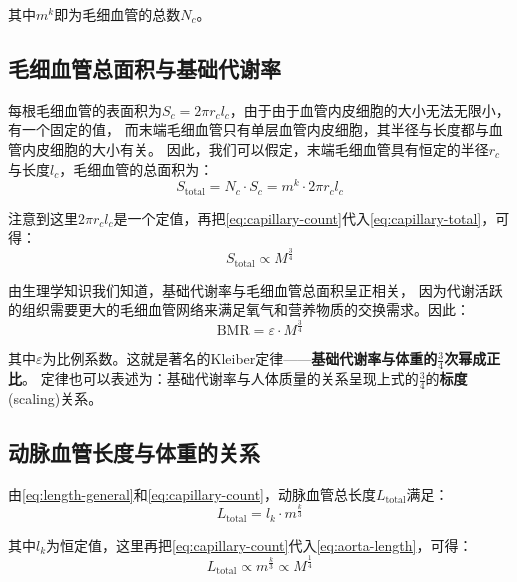 其中$m^k$即为毛细血管的总数$N_c$。

\subsection{毛细血管总面积与基础代谢率}

每根毛细血管的表面积为$S_c = 2\pi r_c l_c$，由于由于血管内皮细胞的大小无法无限小，有一个固定的值，
而末端毛细血管只有单层血管内皮细胞，其半径与长度都与血管内皮细胞的大小有关。
因此，我们可以假定，末端毛细血管具有恒定的半径$r_c$与长度$l_c$，毛细血管的总面积为：
\begin{equation}
S_{\text{total}} = N_c \cdot S_c = m^k \cdot 2\pi r_c l_c
\label{eq:capillary-total}
\end{equation}

注意到这里$ 2\pi r_c l_c$是一个定值，再把\cref{eq:capillary-count}代入\cref{eq:capillary-total}，可得：
\begin{equation}
S_{\text{total}} \propto M^{\frac{3}{4}}
\label{eq:surface-scaling}
\end{equation}

由生理学知识我们知道，基础代谢率与毛细血管总面积呈正相关，
因为代谢活跃的组织需要更大的毛细血管网络来满足氧气和营养物质的交换需求。因此：
\begin{equation}
\text{BMR} = \varepsilon \cdot M^{\frac{3}{4}}
\label{eq:kleiber}
\end{equation}

其中$\varepsilon$为比例系数。这就是著名的Kleiber定律——\textbf{基础代谢率与体重的$\frac{3}{4}$次幂成正比}。
定律也可以表述为：基础代谢率与人体质量的关系呈现上式的$\frac{3}{4}$的\textbf{标度}(scaling)关系。

\subsection{动脉血管长度与体重的关系}

由\cref{eq:length-general}和\cref{eq:capillary-count}，动脉血管总长度$L_{\text{total}}$满足：
\begin{equation}
L_{\text{total}} = l_k \cdot m^{\frac{k}{3}}
\label{eq:aorta-length}
\end{equation}

其中$l_k$为恒定值，这里再把\cref{eq:capillary-count}代入\cref{eq:aorta-length}，可得：
\begin{equation}
L_{\text{total}} \propto m^{\frac{k}{3}} \propto M^{\frac{1}{4}}
\label{eq:aorta-scaling}
\end{equation}

